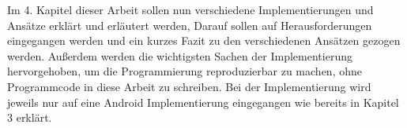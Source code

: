 Im 4. Kapitel dieser Arbeit sollen nun verschiedene Implementierungen und Ansätze erklärt und erläutert werden, Darauf sollen auf Herausforderungen eingegangen werden und ein kurzes Fazit zu den verschiedenen Ansätzen gezogen werden. Außerdem werden die wichtigsten Sachen der Implementierung hervorgehoben, um die Programmierung reproduzierbar zu machen, ohne Programmcode in diese Arbeit zu schreiben. Bei der Implementierung wird jeweils nur auf eine Android Implementierung eingegangen wie bereits in Kapitel 3 erklärt. 